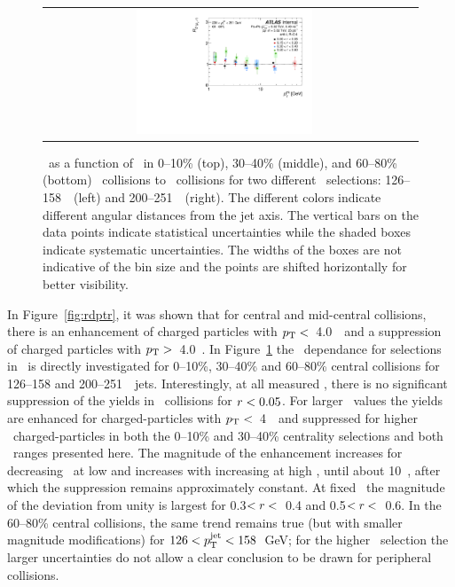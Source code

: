 \begin{figure}
{\begin{tabular}{cc}
	 \includegraphics[width=0.5\textwidth]{figures/main/results/RDpT_trkpt_jet9_cent5} \\
\end{tabular} }
   \caption{\RDptr\ as a function of \pt\ in  0--10\% (top), 30--40\% (middle), and 60--80\% (bottom) \PbPb\ collisions to \pp\ collisions for two different \ptjet\ selections: 126--158~\GeV\ (left) and 200--251~\GeV\ (right). The different colors indicate different angular distances from the jet axis. The vertical bars on the data points indicate statistical uncertainties while the shaded boxes indicate systematic uncertainties. The widths of the boxes are not indicative of the bin size and the points are shifted horizontally for better visibility.}
      \label{fig:pttrkdep}
\end{figure}


In Figure~\ref{fig:rdptr}, it was shown that for central and mid-central collisions, there is an enhancement of
charged particles with $\mbox{$p_{\mathrm{T}}$} <$~4.0~\GeV\ and a suppression of charged particles with $\mbox{$p_{\mathrm{T}}$} >$~4.0~\GeV.  In
Figure~\ref{fig:pttrkdep} 
the \pt\ dependance for selections in \rvar\ is directly investigated for 0--10\%, 30--40\% and 60--80\% central 
collisions for 126--158 and 200--251~\GeV\ jets.
Interestingly, at all measured \pt, there is no significant suppression of the yields in \pbpb\ collisions
for $\mbox{$r$} < 0.05$.  For larger \rvar\ values the yields are enhanced for charged-particles with $\mbox{$p_{\mathrm{T}}$} <$~4~\GeV\ and 
suppressed for higher \pt\ charged-particles in both the 0--10\% and 30--40\% centrality selections and both \ptjet\ 
ranges presented here.  The magnitude of the enhancement increases for decreasing \pt\ at low \pt and increases
with increasing \pt at high \pt, until about 10~\GeV, after which the suppression remains approximately constant.
At fixed \pt\ the magnitude of the deviation from unity is largest for 0.3$< \mbox{$r$} <$~0.4 and 0.5$< \mbox{$r$} <$~0.6.
In the 60--80\% central collisions, the same trend remains true (but with smaller magnitude 
modifications) for \mbox{$126 < \mbox{$p_{\mathrm{T}}^{\mathrm{jet}}$} < 158$ GeV}; for the higher \ptjet\ selection the larger uncertainties 
do not allow a clear conclusion to be drawn for peripheral collisions.

